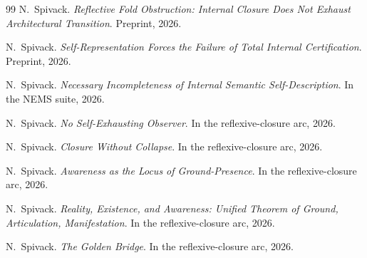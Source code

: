 \documentclass[11pt]{article}
\theoremstyle{plain}
\theoremstyle{definition}
\theoremstyle{remark}
\begin{document}
\begin{thebibliography}{99}
N.~Spivack.
\newblock \emph{Reflective Fold Obstruction: Internal Closure Does Not Exhaust Architectural Transition}.
\newblock Preprint, 2026.

N.~Spivack.
\newblock \emph{Self-Representation Forces the Failure of Total Internal Certification}.
\newblock Preprint, 2026.

N.~Spivack.
\newblock \emph{Necessary Incompleteness of Internal Semantic Self-Description}.
\newblock In the NEMS suite, 2026.

N.~Spivack.
\newblock \emph{No Self-Exhausting Observer}.
\newblock In the reflexive-closure arc, 2026.

N.~Spivack.
\newblock \emph{Closure Without Collapse}.
\newblock In the reflexive-closure arc, 2026.

N.~Spivack.
\newblock \emph{Awareness as the Locus of Ground-Presence}.
\newblock In the reflexive-closure arc, 2026.

N.~Spivack.
\newblock \emph{Reality, Existence, and Awareness: Unified Theorem of Ground, Articulation, Manifestation}.
\newblock In the reflexive-closure arc, 2026.

N.~Spivack.
\newblock \emph{The Golden Bridge}.
\newblock In the reflexive-closure arc, 2026.

\end{thebibliography}
\end{document}
